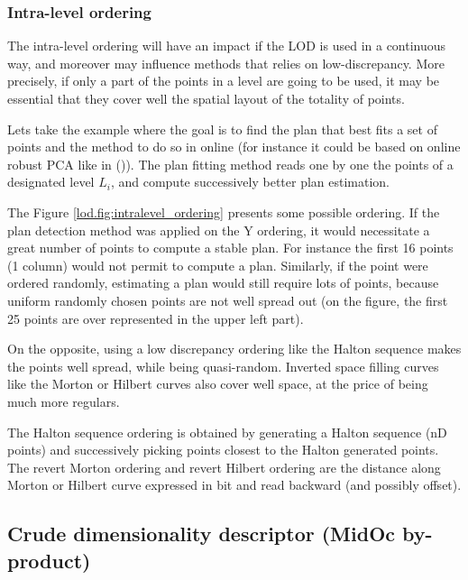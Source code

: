 		\subsubsection{Intra-level ordering}
		\label{lod.method.intralevel}
		
		
		The intra-level ordering will have an impact if the LOD is used in a continuous way,
		and moreover may influence methods that relies on low-discrepancy.
		More precisely, if only a part of the points in a level are going to be used,
		it may be essential that they cover well the spatial layout of the totality of points.
		
		Lets take the example where the goal is to find the plan that best fits a set of points
		and the method to do so in online (for instance it could be based on online robust PCA like in (\cite{Feng2013})).
		The plan fitting method reads one by one the points of a designated level $L_i$, and compute successively better plan estimation.
		
		The Figure \ref{lod.fig:intralevel_ordering} presents some possible ordering. 
		If the plan detection method was applied on the Y ordering, it would necessitate a great number of points to compute a stable plan. For instance the first 16 points (1 column) would not permit to compute a plan.
		Similarly, if the point were ordered randomly, estimating a plan would still require lots of points, because uniform randomly chosen points are not well spread out (on the figure, the first 25 points are over represented in the upper left part).
		
		On the opposite, using a low discrepancy ordering like the Halton sequence makes the points well spread, while being quasi-random.
		Inverted space filling curves like the Morton or Hilbert curves also cover well space, at the price of being much more regulars.
		
		The Halton sequence ordering is obtained by generating a Halton sequence (nD points) and successively picking points closest to the Halton generated points.
		The revert Morton ordering and revert Hilbert ordering are the distance along Morton or Hilbert curve expressed in bit and read backward (and possibly offset).
		

	\subsection{Crude dimensionality descriptor (MidOc by-product)} 
		\label{lod.method.dimdescriptor}
